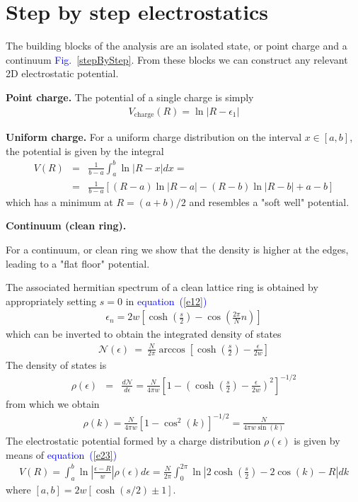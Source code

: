 \documentclass[aps,pre,floats,floatfix,twocolumn]{revtex4}
\newcommand{\beq}{\begin{eqnarray}}
\newcommand{\eeq}{\end{eqnarray}}
\newcommand{\Eq}[1]{\textcolor{blue}{{equation}\!~(\ref{#1})}}
\newcommand{\Fig}[1]{\textcolor{blue}{Fig.}\!\!~\ref{#1}}
\begin{document}
\section{Step by step electrostatics}
\label{A10}

The building blocks of the analysis are an isolated state, or point charge
and a continuum \Fig{stepByStep}. 
From these blocks we can construct any relevant 2D electrostatic potential.

{\bf Point charge.}  The potential of a single charge is simply 
%
\beq
V_{\text{charge}}(R) = \ln |R-\epsilon_1|
\eeq
%

{\bf Uniform charge.}
For a uniform charge distribution on the interval $x\in [a,b]$, the potential is given by the integral 
%
\beq
V(R) &=& \frac{1}{b-a}\int_a^b \ln |R-x| dx = \\
&=& \frac{1}{b-a}\left[(R-a)\ln|R-a| - (R-b)\ln |R-b| +a-b\right]
\eeq
%
which has a minimum at $R=(a+b)/2$ and resembles a "soft well" potential.

{\bf Continuum (clean ring).} 

For a continuum, or clean ring we show that the density is higher at the edges, leading to a "flat floor" potential.

The associated hermitian spectrum of a clean lattice ring is obtained by appropriately setting $s=0$ in \Eq{e12}
%
\beq
\epsilon_n = 2w\left[ \cosh \left(\frac{s}{2}\right) - \cos\left(\frac{2\pi}{N}n\right) \right]
\eeq
%
which can be inverted to obtain the integrated density of states
%
\beq
\mathcal{N}(\epsilon) \ = \ \frac{N}{2\pi }\arccos \left[  \cosh \left(\frac{s}{2}\right)  - \frac{\epsilon}{2w} \right]
\eeq
%
The density of states is 
%
\beq
\rho(\epsilon) &=& \frac{d\mathcal{N}}{d\epsilon} = 
\frac{N}{4\pi w}\left[ 1- \left(   \cosh \left(\frac{s}{2}\right)  - \frac{\epsilon}{2w}\right)^2\right]^{-1/2} 
\eeq
%
from which we obtain
%
\beq
\rho(k) = \frac{N}{4\pi w}\left[ 1-\cos^2 (k)\right]^{-1/2} =  \frac{N}{4\pi w\sin(k) }
\eeq
%
The electrostatic potential formed by a charge distribution $\rho(\epsilon)$ is given by means of \Eq{e23}
%
\beq
V(R) = \int_a^b  \ln \left| \frac{\epsilon - R}{w}\right| \rho(\epsilon) d\epsilon = 
\frac{N}{2\pi} \int_0^{2\pi} \ln \left| 2\cosh\left(\frac{s}{2}\right) - 2\cos(k) - R\right| dk 
\eeq
%
where $[a,b] = 2w[\cosh(s/2) \pm 1]$. 



\end{document}
